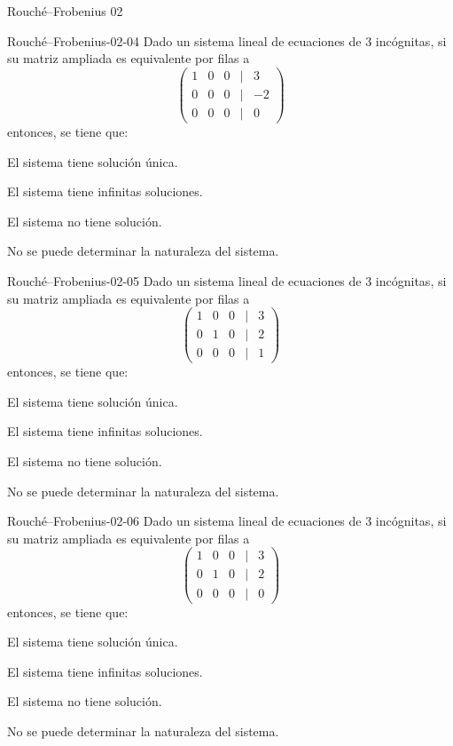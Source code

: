 \documentclass[a4,11pt]{aleph-notas}
\begin{document}
\begin{quiz}{Rouché–Frobenius 02}
\begin{multi}[]%
    {Rouché–Frobenius-02-04}
    Dado un sistema lineal de ecuaciones de 3 incógnitas, si su matriz ampliada es equivalente por filas a 
    \[
    \begin{pmatrix}
    1 & 0 & 0 & | & 3 \\
    0 & 0 & 0 & | & -2 \\
    0 & 0 & 0 & | & 0
    \end{pmatrix}
    \]
    entonces, se tiene que:
    \item El sistema tiene solución única.
    \item El sistema tiene infinitas soluciones.
    \item* El sistema no tiene solución.
    \item No se puede determinar la naturaleza del sistema.
\end{multi}

\begin{multi}[]%
    {Rouché–Frobenius-02-05}
    Dado un sistema lineal de ecuaciones de 3 incógnitas, si su matriz ampliada es equivalente por filas a 
    \[
    \begin{pmatrix}
    1 & 0 & 0 & | & 3 \\
    0 & 1 & 0 & | & 2 \\
    0 & 0 & 0 & | & 1
    \end{pmatrix}
    \]
    entonces, se tiene que:
    \item El sistema tiene solución única.
    \item El sistema tiene infinitas soluciones.
    \item* El sistema no tiene solución.
    \item No se puede determinar la naturaleza del sistema.
\end{multi}

\begin{multi}[]%
    {Rouché–Frobenius-02-06}
    Dado un sistema lineal de ecuaciones de 3 incógnitas, si su matriz ampliada es equivalente por filas a 
    \[
    \begin{pmatrix}
    1 & 0 & 0 & | & 3 \\
    0 & 1 & 0 & | & 2 \\
    0 & 0 & 0 & | & 0
    \end{pmatrix}
    \]
    entonces, se tiene que:
    \item El sistema tiene solución única.
    \item* El sistema tiene infinitas soluciones.
    \item El sistema no tiene solución.
    \item No se puede determinar la naturaleza del sistema.
\end{multi}


\end{quiz}
\end{document}

